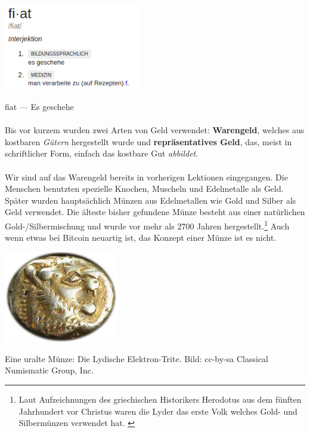 \begin{center}
  \centering
  \includegraphics[width=6cm]{assets/images/fiat-definition-de.png}
  \caption{fiat --- Es geschehe}
  \label{fig:fiat-definition}
\end{center}

\paragraph{}
Bis vor kurzem wurden zwei Arten von Geld verwendet: \textbf{Warengeld}, welches
aus kostbaren \textit{Gütern} hergestellt wurde und \textbf{repräsentatives
Geld}, das, meist in schriftlicher Form, einfach das kostbare Gut
\textit{abbildet}.

\paragraph{}
Wir sind auf das Warengeld bereits in vorherigen Lektionen eingegangen. Die
Menschen benutzten spezielle Knochen, Muscheln und Edelmetalle als Geld. Später
wurden hauptsächlich Münzen aus Edelmetallen wie Gold und Silber als Geld
verwendet. Die älteste bisher gefundene Münze besteht aus einer natürlichen
Gold-/Silbermischung und wurde vor mehr als 2700 Jahren hergestellt.\footnote{
Laut Aufzeichnungen des griechischen Historikers Herodotus aus dem fünften
Jahrhundert vor Christus waren die Lyder das erste Volk welches Gold- und
Silbermünzen verwendet hat. \cite{coinage-origins}} Auch wenn etwas bei Bitcoin
neuartig ist, das Konzept einer Münze ist es nicht.

\begin{center}
  \centering
  \includegraphics[width=5cm]{assets/images/lydian-coin-stater.png}
  \caption{Eine uralte Münze: Die Lydische Elektron-Trite. Bild: cc-by-sa Classical Numismatic Group, Inc.}
  \label{fig:lydian-coin-stater}
\end{center}

